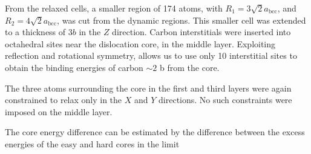 \documentclass[a4paper,11pt]{article}
\begin{document}
From the relaxed cells, a smaller region of 174 atoms, with \(R_1 =
   3\sqrt{2}a_{\text{bcc}}\), and \(R_2 = 4\sqrt{2}a_{\text{bcc}}\), was cut from
the dynamic regions. This smaller cell was extended to a thickness of 3\(b\) in
the \(Z\) direction. Carbon interstitials were inserted into octahedral sites
near the dislocation core, in the middle layer. Exploiting reflection and
rotational symmetry, allows us to use only 10 interstitial
sites to obtain the binding energies of carbon \(\sim2\) b from the core. 

The three atoms surrounding the core in the first and third layers were again
constrained to relax only in the \(X\) and \(Y\) directions. No such constraints
were imposed on the middle layer. 

The core energy difference can be estimated by the difference
between the excess energies of the easy and hard cores in the limit
\end{document}

